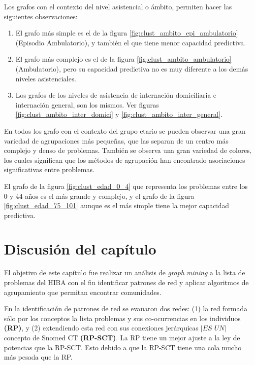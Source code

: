Los grafos con el contexto del nivel asistencial o ámbito, permiten hacer las siguientes observaciones:

\begin{enumerate}
\item El grafo más simple es el de la figura \ref{fig:clust_ambito_epi_ambulatorio} (Episodio Ambulatorio), y también el que tiene menor capacidad predictiva.
\item El grafo más complejo es el de la figura \ref{fig:clust_ambito_ambulatorio} (Ambulatorio), pero su capacidad predictiva no es muy diferente a los demás niveles asistenciales.
\item Los grafos de los niveles de asistencia de internación domiciliaria e internación general, son los mismos. Ver figuras \ref{fig:clust_ambito_inter_domici}  y \ref{fig:clust_ambito_inter_general}.

\end{enumerate}
En todos los grafo con el contexto del grupo etario se pueden observar una gran variedad de agrupaciones más pequeñas, que las separan de un centro más complejo y denso de problemas. También se observa una gran variedad de colores, los cuales significan que los métodos de agrupación han encontrado asociaciones significativas entre problemas.

El grafo de la figura \ref{fig:clust_edad_0_4} que representa los problemas entre los 0 y 44 años es el más grande y complejo, y el grafo de la figura \ref{fig:clust_edad_75_101} aunque es el más simple tiene la mejor capacidad predictiva.

\section{Discusión del capítulo}
El objetivo de este capítulo fue realizar un análisis de \textit{graph mining} a la lista de problemas del HIBA con el fin identificar patrones de red y aplicar algoritmos de agrupamiento que permitan encontrar comunidades.

En la identificación de patrones de red se evauaron dos redes: (1) la red formada sólo por los conceptos la lista problemas y sus co-ocurrencias en los individuos \textbf{(\acrshort{RP})}, y (2) extendiendo esta red con sus conexiones jerárquicas $|\textit{ES UN}|$  concepto de Snomed CT \textbf{(\acrshort{RP-SCT})}. La \acrshort{RP} tiene un mejor ajuste a la ley de potencias que la \acrshort{RP-SCT}. Esto debido a que la \acrshort{RP-SCT} tiene una cola mucho más pesada que la \acrshort{RP}. 

